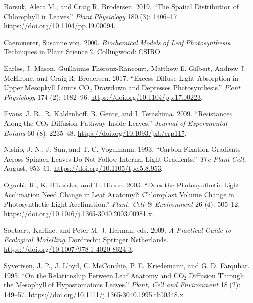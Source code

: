 \documentclass[
  letterpaper,
  DIV=11,
  numbers=noendperiod]{scrartcl}
\newlength{\cslhangindent}
\newlength{\cslentryspacingunit} %
\newenvironment{CSLReferences}[2] %
 {%
  \setlength{\parindent}{0pt}
  \ifodd #1
  \let\oldpar\par
  \def\par{\hangindent=\cslhangindent\oldpar}
  \fi
  \setlength{\parskip}{#2\cslentryspacingunit}
 }%
 {}
\begin{document}
\hypertarget{refs}{}
\begin{CSLReferences}{1}{0}
\leavevmode{}%
Borsuk, Aleca M., and Craig R. Brodersen. 2019. {``The Spatial
Distribution of Chlorophyll in Leaves.''} \emph{Plant Physiology} 180
(3): 1406--17. \url{https://doi.org/10.1104/pp.19.00094}.

\leavevmode{}%
Caemmerer, Susanne von. 2000. \emph{Biochemical Models of Leaf
Photosynthesis}. Techniques in Plant Science 2. Collingwood: CSIRO.

\leavevmode{}%
Earles, J. Mason, Guillaume Théroux-Rancourt, Matthew E. Gilbert, Andrew
J. McElrone, and Craig R. Brodersen. 2017. {``Excess Diffuse Light
Absorption in Upper Mesophyll Limits {CO}\(_{\textrm{2}}\) Drawdown and
Depresses Photosynthesis.''} \emph{Plant Physiology} 174 (2): 1082--96.
\url{https://doi.org/10.1104/pp.17.00223}.

\leavevmode{}%
Evans, J. R., R. Kaldenhoff, B. Genty, and I. Terashima. 2009.
{``Resistances Along the {CO}\(_{\textrm{2}}\) Diffusion Pathway Inside
Leaves.''} \emph{Journal of Experimental Botany} 60 (8): 2235--48.
\url{https://doi.org/10.1093/jxb/erp117}.

\leavevmode{}%
Nishio, J. N., J. Sun, and T. C. Vogelmann. 1993. {``Carbon {Fixation}
{Gradients} Across {Spinach} {Leaves} {Do} {Not} {Follow} {Internal}
{Light} {Gradients}.''} \emph{The Plant Cell}, August, 953--61.
\url{https://doi.org/10.1105/tpc.5.8.953}.

\leavevmode{}%
Oguchi, R., K. Hikosaka, and T. Hirose. 2003. {``Does the Photosynthetic
Light-Acclimation Need Change in Leaf Anatomy?: {Chloroplast} Volume
Change in Photosynthetic Light-Acclimation.''} \emph{Plant, Cell \&
Environment} 26 (4): 505--12.
\url{https://doi.org/10.1046/j.1365-3040.2003.00981.x}.

\leavevmode{}%
Soetaert, Karline, and Peter M. J. Herman, eds. 2009. \emph{A
{Practical} {Guide} to {Ecological} {Modelling}}. Dordrecht: Springer
Netherlands. \url{https://doi.org/10.1007/978-1-4020-8624-3}.

\leavevmode{}%
Syvertsen, J. P., J. Lloyd, C. McConchie, P. E. Kriedemann, and G. D.
Farquhar. 1995. {``On the Relationship Between Leaf Anatomy and
{CO}\(_{\textrm{2}}\) Diffusion Through the Mesophyll of Hypostomatous
Leaves.''} \emph{Plant, Cell and Environment} 18 (2): 149--57.
\url{https://doi.org/10.1111/j.1365-3040.1995.tb00348.x}.


\end{CSLReferences}
\end{document}
